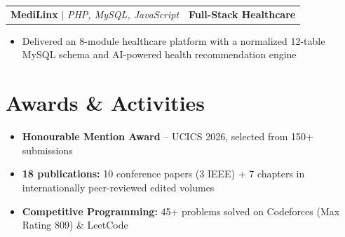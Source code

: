 \documentclass[11pt,a4paper]{article}
\makeatletter
\newcommand{\projectHeading}[3]{
  \vspace{4pt}
  \noindent
  \begin{tabular*}{\textwidth}{@{}l@{\extracolsep{\fill}}r@{}}
    \textbf{#1} $|$ \textit{#2} & \textbf{#3} \\
  \end{tabular*}
}
\makeatother
\begin{document}
\projectHeading{MediLinx}{PHP, MySQL, JavaScript}{Full-Stack Healthcare}
\begin{itemize}
    \item Delivered an 8-module healthcare platform with a normalized 12-table MySQL schema and AI-powered health recommendation engine
\end{itemize}

\section*{Awards \& Activities}

\begin{itemize}
    \item \textbf{Honourable Mention Award} -- UCICS 2026, selected from 150+ submissions
    \item \textbf{18 publications:} 10 conference papers (3 IEEE) + 7 chapters in internationally peer-reviewed edited volumes
    \item \textbf{Competitive Programming:} 45+ problems solved on Codeforces (Max Rating 809) \& LeetCode
\end{itemize}
\end{document}
